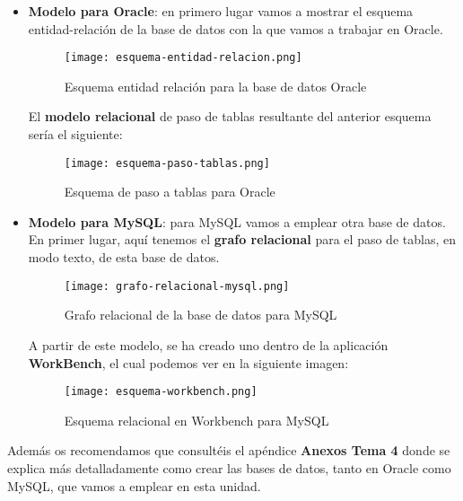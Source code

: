 \begin{itemize}
    \item \textbf{Modelo para Oracle}: en primero lugar vamos a mostrar el esquema entidad-relación de la base de datos con la que vamos a trabajar en Oracle.

    \begin{figure}[H]
        \centering
        \texttt{[image: esquema-entidad-relacion.png]}
        \caption{Esquema entidad relación para la base de datos Oracle}
    \end{figure}

    El \textbf{modelo relacional} de paso de tablas resultante del anterior esquema sería el siguiente:

    \begin{figure}[H]
        \centering
        \texttt{[image: esquema-paso-tablas.png]}
        \caption{Esquema de paso a tablas para Oracle}
    \end{figure}

    \item \textbf{Modelo para MySQL}: para MySQL vamos a emplear otra base de datos. En primer lugar, aquí tenemos el \textbf{grafo relacional} para el paso de tablas, en modo texto, de esta base de datos.

    \begin{figure}[H]
        \centering
        \texttt{[image: grafo-relacional-mysql.png]}
        \caption{Grafo relacional de la base de datos para MySQL}
    \end{figure}

    A partir de este modelo, se ha creado uno dentro de la aplicación \textbf{WorkBench}, el cual podemos ver en la siguiente imagen:

    \begin{figure}[H]
        \centering
        \texttt{[image: esquema-workbench.png]}
        \caption{Esquema relacional en Workbench para MySQL}
    \end{figure}
\end{itemize}

Además os recomendamos que consultéis el apéndice \textbf{Anexos Tema 4} donde se explica más detalladamente como crear las bases de datos, tanto en Oracle como MySQL, que vamos a emplear en esta unidad.


\appendix

